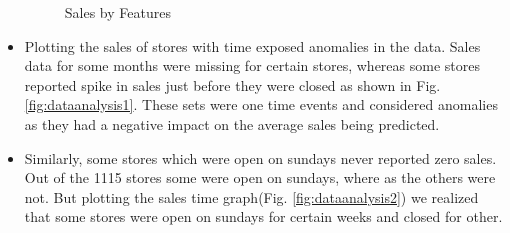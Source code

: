 \documentclass[12pt,a4paper]{article}
\begin{document}
\begin{itemize}
\begin{figure}[H]
{	      		\label{fig:asbp}
	      	}
	      	\caption{Sales by Features}
	      	\label{fig:salesbyfeatures1}        			
	      \end{figure}
	      		    
	\item Plotting the sales of stores with time exposed anomalies in the data. Sales data for some months were missing for certain stores,  whereas some stores reported spike in sales just before they were closed as shown in Fig. \ref{fig:dataanalysis1}. These sets were one time events and considered anomalies as they had a negative impact on the average sales being predicted.
	      
	\item Similarly, some stores which were open on sundays never reported zero sales. Out of the 1115 stores some were open on sundays, where as the others were not. But plotting the sales time graph(Fig. \ref{fig:dataanalysis2}) we realized that some stores were open on sundays for certain weeks and closed for other. 
	      		    

\end{itemize}
\end{document}
